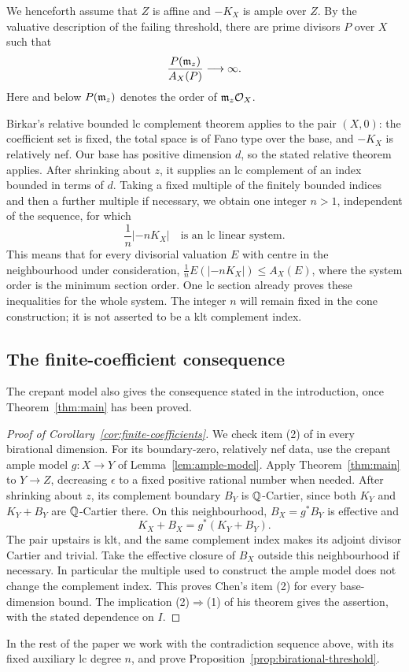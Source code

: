 We henceforth assume that $Z$ is affine and $-K_X$ is ample over $Z$.
By the valuative description of the failing threshold, there are prime
divisors $P$ over $X$ such that
\begin{equation}\label{eq:bad-prime-ratio}
 \frac{P(\mathfrak m_z)}{A_X(P)}\longrightarrow\infty.
\end{equation}
Here and below $P(\mathfrak m_z)$ denotes the order of $\mathfrak m_z\mathcal O_X$.

Birkar's relative bounded lc complement theorem
\cite[Theorem~1.8]{BirkarComplements} applies to the pair $(X,0)$: the
coefficient set is fixed, the total space is of Fano type over the base,
and $-K_X$ is relatively nef. Our base has positive dimension $d$, so the
stated relative theorem applies. After shrinking about $z$, it supplies an
lc complement of an index bounded in terms of $d$. Taking a fixed multiple
of the finitely bounded indices and then a further multiple if necessary,
we obtain one integer $n>1$, independent of the sequence, for which
\begin{equation}\label{eq:auxiliary-lc-system}
 \frac{1}{n}|-nK_X|\quad\text{is an lc linear system}.
\end{equation}
This means that for every divisorial valuation $E$ with centre in the
neighbourhood under consideration,
$\frac1n E(|-nK_X|)\le A_X(E)$, where the system order is the minimum
section order. One lc section already proves these inequalities for the
whole system. The integer $n$ will remain fixed in the cone construction;
it is not asserted to be a klt complement index.

\subsection{The finite-coefficient consequence}

The crepant model also gives the consequence stated in the introduction,
once Theorem~\ref{thm:main} has been proved.

\begin{proof}[Proof of Corollary~\ref{cor:finite-coefficients}]
We check item (2) of \cite[Theorem~1.6]{Chen} in every birational dimension.
For its boundary-zero, relatively nef data, use the crepant ample model
$g\colon X\to Y$ of Lemma~\ref{lem:ample-model}. Apply
Theorem~\ref{thm:main} to $Y\to Z$, decreasing $\epsilon$ to a fixed
positive rational number when needed. After shrinking about $z$, its
complement boundary $B_Y$ is $\mathbb Q$-Cartier, since both $K_Y$ and
$K_Y+B_Y$ are $\mathbb Q$-Cartier there. On this neighbourhood,
$B_X=g^*B_Y$ is effective and
\[
 K_X+B_X=g^*(K_Y+B_Y).
\]
The pair upstairs is klt, and the same complement index makes its adjoint
divisor Cartier and trivial. Take the effective closure of $B_X$ outside
this neighbourhood if necessary. In particular the multiple used to construct
the ample model does not change the complement index. This proves Chen's
item (2) for every base-dimension bound. The implication (2)$\Rightarrow$(1)
of his theorem gives the assertion, with the stated dependence on $I$.
\end{proof}

In the rest of the paper we work with the contradiction sequence above,
with its fixed auxiliary lc degree $n$, and prove
Proposition~\ref{prop:birational-threshold}.

